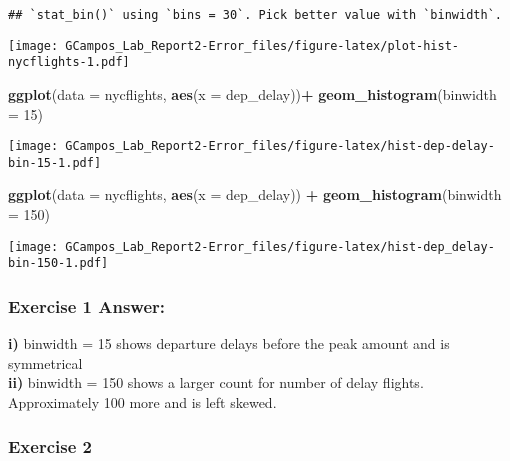 \documentclass[
]{article}
\newenvironment{Shaded}{\begin{snugshade}}{\end{snugshade}}
\newcommand{\DataTypeTok}[1]{\textcolor[rgb]{0.13,0.29,0.53}{#1}}
\newcommand{\DecValTok}[1]{\textcolor[rgb]{0.00,0.00,0.81}{#1}}
\newcommand{\KeywordTok}[1]{\textcolor[rgb]{0.13,0.29,0.53}{\textbf{#1}}}
\newcommand{\NormalTok}[1]{#1}
\newcommand{\OperatorTok}[1]{\textcolor[rgb]{0.81,0.36,0.00}{\textbf{#1}}}
\newcommand{\StringTok}[1]{\textcolor[rgb]{0.31,0.60,0.02}{#1}}
\begin{document}
\begin{verbatim}
## `stat_bin()` using `bins = 30`. Pick better value with `binwidth`.
\end{verbatim}

\texttt{[image: GCampos\_Lab\_Report2-Error\_files/figure-latex/plot-hist-nycflights-1.pdf]}

\begin{Shaded}
\begin{Highlighting}[]
\KeywordTok{ggplot}\NormalTok{(}\DataTypeTok{data =}\NormalTok{ nycflights, }\KeywordTok{aes}\NormalTok{(}\DataTypeTok{x =}\NormalTok{ dep_delay))}\OperatorTok{+}
\StringTok{    }\KeywordTok{geom_histogram}\NormalTok{(}\DataTypeTok{binwidth =} \DecValTok{15}\NormalTok{)}
\end{Highlighting}
\end{Shaded}

\texttt{[image: GCampos\_Lab\_Report2-Error\_files/figure-latex/hist-dep-delay-bin-15-1.pdf]}

\begin{Shaded}
\begin{Highlighting}[]
\KeywordTok{ggplot}\NormalTok{(}\DataTypeTok{data =}\NormalTok{ nycflights, }\KeywordTok{aes}\NormalTok{(}\DataTypeTok{x =}\NormalTok{ dep_delay)) }\OperatorTok{+}
\StringTok{    }\KeywordTok{geom_histogram}\NormalTok{(}\DataTypeTok{binwidth =} \DecValTok{150}\NormalTok{)}
\end{Highlighting}
\end{Shaded}

\texttt{[image: GCampos\_Lab\_Report2-Error\_files/figure-latex/hist-dep\_delay-bin-150-1.pdf]}

\hypertarget{exercise-1-answer}{%
\subsubsection{\texorpdfstring{\textbf{Exercise 1
Answer:}}{Exercise 1 Answer:}}\label{exercise-1-answer}}

\textbf{i)} binwidth = 15 shows departure delays before the peak amount
and is symmetrical\newline\\
\textbf{ii)} binwidth = 150 shows a larger count for number of delay
flights. Approximately 100 more and is left skewed.

\hypertarget{exercise-2}{%
\subsubsection{Exercise 2}\label{exercise-2}}
\end{document}
